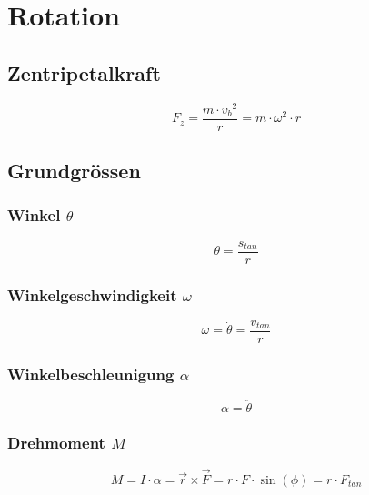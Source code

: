 



\chapter{Rotation}
\section{Zentripetalkraft}
\[ F_z = \frac{m \cdot {v_b}^2}{r} = m \cdot \omega^2 \cdot r \]

\section{Grundgrössen}

\subsection{Winkel $\theta$}
\[ \theta = \frac{s_{tan}}{r} \]

\subsection{Winkelgeschwindigkeit $\omega$}
\[ \omega = \dot{\theta} = \frac{v_{tan}}{r} \]

\subsection{Winkelbeschleunigung $\alpha$}
\[ \alpha = \ddot{\theta} \]

\subsection{Drehmoment $M$}
\[ M = I \cdot \alpha = \vec{r} \times \vec{F} = r \cdot F \cdot \sin(\phi) 
= r \cdot F_{tan} \]

